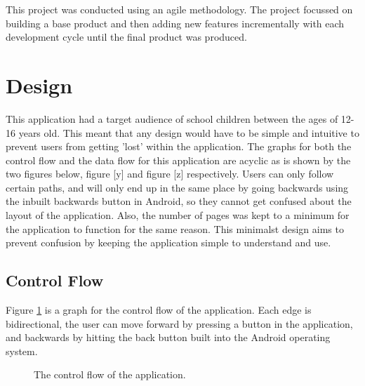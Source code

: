 \documentclass{article}
\begin{document}
This project was conducted using an agile methodology. The project focussed on building a base product and then adding new features incrementally with each development cycle until the final product was produced. 


\section{Design}
\label{section:design}

This application had a target audience of school children between the ages of 12-16 years old. This meant that any design would have to be simple and intuitive to prevent users from getting 'lost' within the application. The graphs for both the control flow and the data flow for this application are acyclic as is shown by the two figures below, figure [y] and figure [z] respectively. Users can only follow certain paths, and will only end up in the same place by going backwards using the inbuilt backwards button in Android, so they cannot get confused about the layout of the application. Also, the number of pages was kept to a minimum for the application to function for the same reason. This minimalst design aims to prevent confusion by keeping the application simple to understand and use. \\

\subsection{Control Flow}

Figure \ref{figure:applicationControlFlow} is a graph for the control flow of the application. Each edge is bidirectional, the user can move forward by pressing a button in the application, and backwards by hitting the back button built into the Android operating system. \\

\begin{figure}[H]
	\centering
	\caption{The control flow of the application.}
	\label{figure:applicationControlFlow}
\end{figure}
\end{document}
